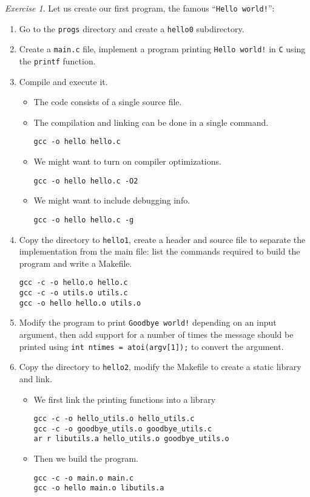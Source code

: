 \documentclass[onecolumn, oneside, a4paper, 11pt]{memoir}
\theoremstyle{remark}
\newtheorem{ex}{Exercise}
\begin{document}
\begin{ex}
Let us create our first program, the famous ``\texttt{Hello world!}'':
\begin{enumerate}
\item Go to the \texttt{progs} directory and create a \texttt{hello0} subdirectory.
\item Create a \texttt{main.c} file, implement a program printing \texttt{Hello world!} in \texttt{C} using the \texttt{printf} function.
\item Compile and execute it.
  \begin{itemize}
  \item The code consists of a single source file.
  \item The compilation and linking can be done in a single command. \\
\begin{lstlisting}[style=shell]
gcc -o hello hello.c
\end{lstlisting}
  \item We might want to turn on compiler optimizations. \\
\begin{lstlisting}[style=shell]
gcc -o hello hello.c -O2
\end{lstlisting}
  \item We might want to include debugging info. \\
\begin{lstlisting}[style=shell]
gcc -o hello hello.c -g
\end{lstlisting}
  \end{itemize}
\item Copy the directory to \texttt{hello1}, create a header and source file to separate the implementation from the main file: list the commands required to build the program and write a Makefile.
\begin{lstlisting}[style=shell]
gcc -c -o hello.o hello.c
gcc -c -o utils.o utils.c
gcc -o hello hello.o utils.o
\end{lstlisting}
\item Modify the program to print \texttt{Goodbye world!} depending on an input argument, then add support for a number of times the message should be printed using \texttt{int ntimes = atoi(argv[1]);} to convert the argument.
\item Copy the directory to \texttt{hello2}, modify the Makefile to create a static library and link.
  \begin{itemize}
  \item We first link the printing functions into a library
\begin{lstlisting}[style=shell]
gcc -c -o hello_utils.o hello_utils.c
gcc -c -o goodbye_utils.o goodbye_utils.c
ar r libutils.a hello_utils.o goodbye_utils.o
\end{lstlisting}
  \item Then we build the program.
\begin{lstlisting}[style=shell]
gcc -c -o main.o main.c
gcc -o hello main.o libutils.a
\end{lstlisting}
  \end{itemize}
\end{enumerate}
\end{ex}
\end{document}
